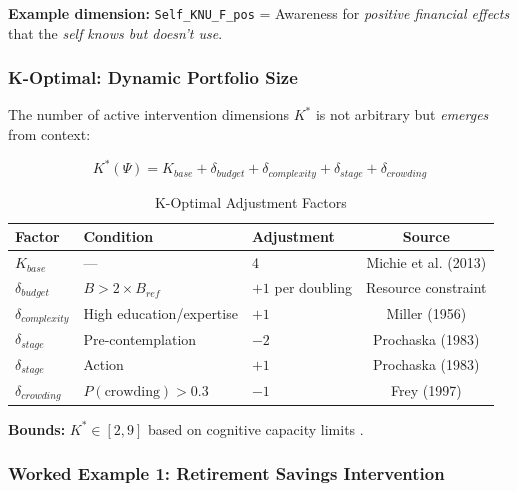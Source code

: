 \textbf{Example dimension:} \texttt{Self\_KNU\_F\_pos} = Awareness for \emph{positive financial effects} that the \emph{self} \emph{knows but doesn't use}.

\subsubsection{K-Optimal: Dynamic Portfolio Size}
\label{subsubsec:k-optimal}

The number of active intervention dimensions $K^*$ is not arbitrary but \emph{emerges} from context:

\begin{equation}
\boxed{K^*(\Psi) = K_{base} + \delta_{budget} + \delta_{complexity} + \delta_{stage} + \delta_{crowding}}
\end{equation}

\begin{table}[htbp]
\centering
\caption{K-Optimal Adjustment Factors}
\label{tab:k-factors}
\small
\begin{tabular}{@{}lllc@{}}
\toprule
\textbf{Factor} & \textbf{Condition} & \textbf{Adjustment} & \textbf{Source} \\
\midrule
$K_{base}$ & --- & 4 & Michie et al. (2013) \\
$\delta_{budget}$ & $B > 2 \times B_{ref}$ & $+1$ per doubling & Resource constraint \\
$\delta_{complexity}$ & High education/expertise & $+1$ & Miller (1956) \\
$\delta_{stage}$ & Pre-contemplation & $-2$ & Prochaska (1983) \\
$\delta_{stage}$ & Action & $+1$ & Prochaska (1983) \\
$\delta_{crowding}$ & $P(\text{crowding}) > 0.3$ & $-1$ & Frey (1997) \\
\bottomrule
\end{tabular}
\end{table}

\textbf{Bounds:} $K^* \in [2, 9]$ based on cognitive capacity limits \citep{miller1956magical}.


\subsubsection{Worked Example 1: Retirement Savings Intervention}
\label{subsubsec:example-retirement}

